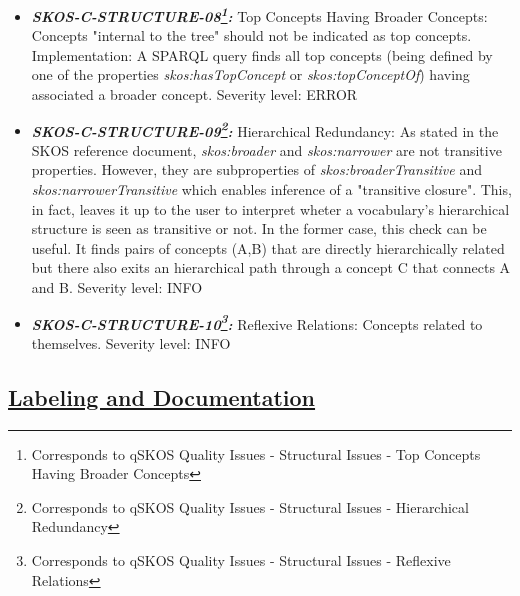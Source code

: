 \documentclass{llncs}
\begin{document}
\begin{itemize}
	\item \textbf{{\em SKOS-C-STRUCTURE-08\footnote{Corresponds to qSKOS Quality Issues - Structural Issues - Top Concepts Having Broader Concepts}:}}
	Top Concepts Having Broader Concepts:
	Concepts "internal to the tree" should not be indicated as top concepts.
	Implementation:
	A SPARQL query finds all top concepts (being defined by one of the properties \emph{skos:hasTopConcept} or \emph{skos:topConceptOf}) having associated a broader concept. 
	Severity level: ERROR
	\item \textbf{{\em SKOS-C-STRUCTURE-09\footnote{Corresponds to qSKOS Quality Issues - Structural Issues - Hierarchical Redundancy}:}}
	Hierarchical Redundancy:
	As stated in the SKOS reference document, \emph{skos:broader} and \emph{skos:narrower} are not transitive properties. However, they are subproperties of \emph{skos:broaderTransitive} and \emph{skos:narrowerTransitive} which enables inference of a "transitive closure". This, in fact, leaves it up to the user to interpret wheter a vocabulary's hierarchical structure is seen as transitive or not. In the former case, this check can be useful. It finds pairs of concepts (A,B) that are directly hierarchically related but there also exits an hierarchical path through a concept C that connects A and B. 
	Severity level: INFO
	\item \textbf{{\em SKOS-C-STRUCTURE-10\footnote{Corresponds to qSKOS Quality Issues - Structural Issues - Reflexive Relations}:}}
	Reflexive Relations:
	Concepts related to themselves. 
	Severity level: INFO
\end{itemize}

\subsection{\underline{Labeling and Documentation}}
\end{document}
